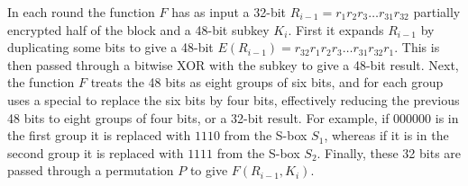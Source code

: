 In each round the function $F$ has as input a 32-bit
$R_{i-1}=r_1r_2r_3\dots r_{31}r_{32}$
partially encrypted half of the block and a 48-bit subkey $K_i$.
First it expands $R_{i-1}$ by duplicating some bits to give a 48-bit
$E\left(R_{i-1}\right)=r_{32}r_1r_2r_3\dots r_{31}r_{32}r_1$.
This is then passed through a bitwise XOR with the subkey
to give a 48-bit result.
Next, the function $F$ treats the 48 bits as eight groups of six bits,
and for each group uses a special  to replace the six bits
by four bits, effectively reducing the previous 48 bits to eight groups of four bits,
or a 32-bit result.
For example, if $000000$ is in the first group it is replaced with $1110$ from
the S-box $S_1$, whereas if it is in the second group it is replaced
with $1111$ from the S-box $S_2$.
Finally, these 32 bits are passed through a permutation $P$
to give $F\left(R_{i-1},K_i\right)$.

